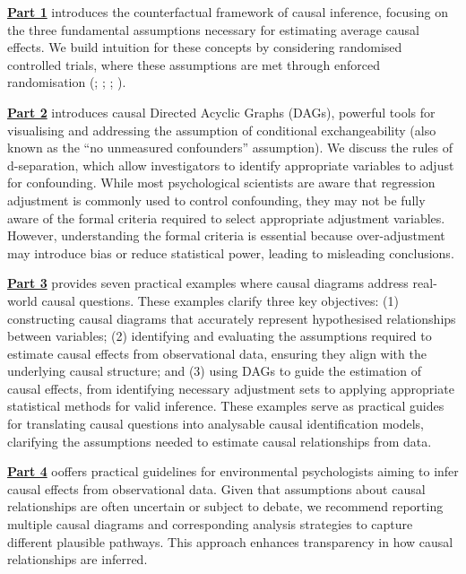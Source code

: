 \documentclass[
  singlecolumn]{article}
\begin{document}
\hyperref[section-part1]{\textbf{Part 1}} introduces the counterfactual
framework of causal inference, focusing on the three fundamental
assumptions necessary for estimating average causal effects. We build
intuition for these concepts by considering randomised controlled
trials, where these assumptions are met through enforced randomisation
(;
;
;
).

\hyperref[section-part2]{\textbf{Part 2}} introduces causal Directed
Acyclic Graphs (DAGs), powerful tools for visualising and addressing the
assumption of conditional exchangeability (also known as the ``no
unmeasured confounders'' assumption). We discuss the rules of
d-separation, which allow investigators to identify appropriate
variables to adjust for confounding. While most psychological scientists
are aware that regression adjustment is commonly used to control
confounding, they may not be fully aware of the formal criteria required
to select appropriate adjustment variables. However, understanding the
formal criteria is essential because over-adjustment may introduce bias
or reduce statistical power, leading to misleading conclusions.

\hyperref[section-part3]{\textbf{Part 3}} provides seven practical
examples where causal diagrams address real-world causal questions.
These examples clarify three key objectives: (1) constructing causal
diagrams that accurately represent hypothesised relationships between
variables; (2) identifying and evaluating the assumptions required to
estimate causal effects from observational data, ensuring they align
with the underlying causal structure; and (3) using DAGs to guide the
estimation of causal effects, from identifying necessary adjustment sets
to applying appropriate statistical methods for valid inference. These
examples serve as practical guides for translating causal questions into
analysable causal identification models, clarifying the assumptions
needed to estimate causal relationships from data.

\hyperref[section-part4]{\textbf{Part 4}} ooffers practical guidelines
for environmental psychologists aiming to infer causal effects from
observational data. Given that assumptions about causal relationships
are often uncertain or subject to debate, we recommend reporting
multiple causal diagrams and corresponding analysis strategies to
capture different plausible pathways. This approach enhances
transparency in how causal relationships are inferred.
\end{document}
